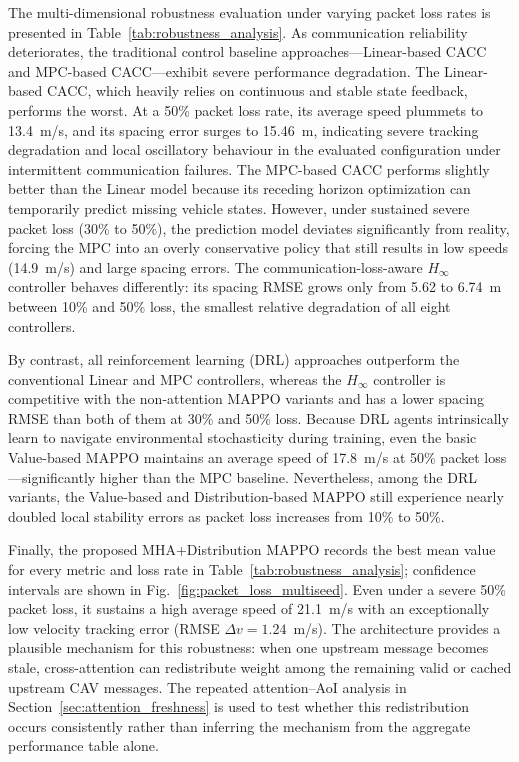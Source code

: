 \documentclass{ieeeaccess}
\begin{document}
The multi-dimensional robustness evaluation under varying packet loss rates is presented in Table~\ref{tab:robustness_analysis}. As communication reliability deteriorates, the traditional control baseline approaches—Linear-based CACC and MPC-based CACC—exhibit severe performance degradation. The Linear-based CACC, which heavily relies on continuous and stable state feedback, performs the worst. At a 50\% packet loss rate, its average speed plummets to 13.4~m/s, and its spacing error surges to 15.46~m, indicating severe tracking degradation and local oscillatory behaviour in the evaluated configuration under intermittent communication failures. The MPC-based CACC performs slightly better than the Linear model because its receding horizon optimization can temporarily predict missing vehicle states. However, under sustained severe packet loss (30\% to 50\%), the prediction model deviates significantly from reality, forcing the MPC into an overly conservative policy that still results in low speeds (14.9~m/s) and large spacing errors. The communication-loss-aware $H_\infty$ controller behaves differently: its spacing RMSE grows only from 5.62 to 6.74~m between 10\% and 50\% loss, the smallest relative degradation of all eight controllers. %

By contrast, all reinforcement learning (DRL) approaches outperform the conventional Linear and MPC controllers, whereas the $H_\infty$ controller is competitive with the non-attention MAPPO variants and has a lower spacing RMSE than both of them at 30\% and 50\% loss. Because DRL agents intrinsically learn to navigate environmental stochasticity during training, even the basic Value-based MAPPO maintains an average speed of 17.8~m/s at 50\% packet loss—significantly higher than the MPC baseline. Nevertheless, among the DRL variants, the Value-based and Distribution-based MAPPO still experience nearly doubled local stability errors as packet loss increases from 10\% to 50\%.

Finally, the proposed MHA+Distribution MAPPO records the best mean value for every metric and loss rate in Table~\ref{tab:robustness_analysis}; confidence intervals are shown in Fig.~\ref{fig:packet_loss_multiseed}. Even under a severe 50\% packet loss, it sustains a high average speed of 21.1~m/s with an exceptionally low velocity tracking error (RMSE $\Delta v = 1.24$~m/s). The architecture provides a plausible mechanism for this robustness: when one upstream message becomes stale, cross-attention can redistribute weight among the remaining valid or cached upstream CAV messages. The repeated attention--AoI analysis in Section~\ref{sec:attention_freshness} is used to test whether this redistribution occurs consistently rather than inferring the mechanism from the aggregate performance table alone. %
\end{document}
